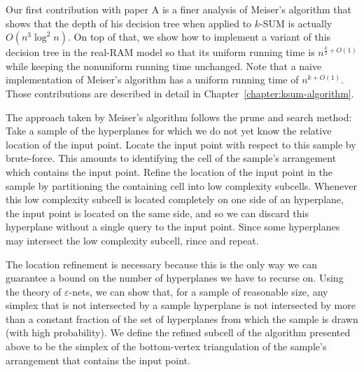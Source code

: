 Our first contribution with paper A is a finer analysis of Meiser's algorithm
that shows that the depth of his decision tree when applied to \(k\)-SUM is
actually \(O(n^3 \log^2 n)\).  On top of that, we show how to implement a
variant of this decision tree in the real-RAM model so that its uniform running
time is \(n^{\frac{k}{2} + O(1)}\) while keeping the nonuniform running time
unchanged. Note that a naive implementation of Meiser's algorithm has a uniform
running time of \(n^{k + O(1)}\). Those contributions are described in detail
in Chapter~\ref{chapter:ksum-algorithm}.

The approach taken by Meiser's algorithm follows the prune and search method:
Take a sample of the hyperplanes for which we do not yet know the relative
location of the input point. Locate the input point with respect to this sample
by brute-force. This amounts to identifying the cell of the sample's arrangement
which contains the input point. Refine the location of the input point in the
sample by partitioning the containing cell into low complexity subcells. Whenever
this low complexity subcell is located completely on one side of an hyperplane,
the input point is located on the same side, and so we can discard this
hyperplane without a single query to the input point. Since some hyperplanes
may intersect the low complexity subcell, rince and repeat.

The location refinement is necessary because this is the only way we can
guarantee a bound on the number of hyperplanes we have to recurse on.
Using the theory of \(\varepsilon\)-nets, we can show that, for a sample of
reasonable size, any simplex that is not intersected by a sample hyperplane
is not intersected by more than a constant fraction of the set of
hyperplanes from which the sample is drawn (with high probability). We
define the refined subcell of the algorithm presented above to be the simplex
of the bottom-vertex triangulation of the sample's arrangement that contains
the input point.
